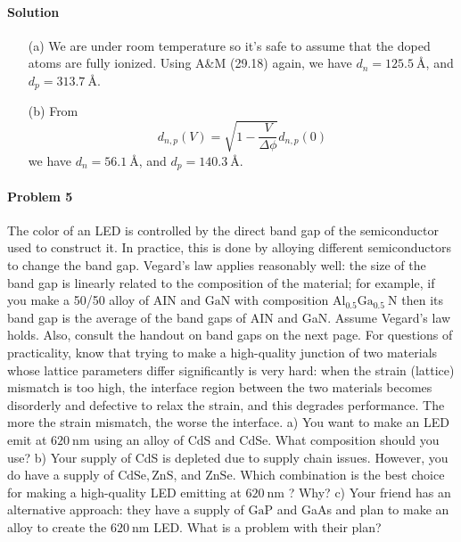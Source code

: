 \documentclass[hyperref, a4paper]{article}
\begin{document}
\paragraph{Solution} \begin{itemize}
\item[(a)] We are under room temperature so it's safe to assume 
that the doped atoms are fully ionized.
Using A\&M (29.18) again, we have $d_n = \SI{125.5}{\angstrom}$,
and $d_p = \SI{313.7}{\angstrom}$.
\item[(b)] From 
\begin{equation}
    d_{n, p}(V) = \sqrt{1 - \frac{V}{\Delta \phi}} d_{n, p}(0)
\end{equation}
we have 
$d_{n} = \SI{56.1}{\angstrom}$, and 
$d_{p} = \SI{140.3}{\angstrom}$.
\end{itemize}

\paragraph{Problem 5}  The color of an LED is controlled by the direct band gap of the semiconductor used to construct it. In practice, this is done by alloying different semiconductors to change the band gap. Vegard's law applies reasonably well: the size of the band gap is linearly related to the composition of the material; for example, if you make a 50/50 alloy of AIN and $\mathrm{GaN}$ with composition $\mathrm{Al}_{0.5} \mathrm{Ga}_{0.5} \mathrm{~N}$ then its band gap is the average of the band gaps of AIN and GaN. Assume Vegard's law holds. Also, consult the handout on band gaps on the next page. For questions of practicality, know that trying to make a high-quality junction of two materials whose lattice parameters differ significantly is very hard: when the strain (lattice) mismatch is too high, the interface region between the two materials becomes disorderly and defective to relax the strain, and this degrades performance. The more the strain mismatch, the worse the interface.
a) You want to make an LED emit at $620 \mathrm{~nm}$ using an alloy of CdS and CdSe. What composition should you use?
b) Your supply of CdS is depleted due to supply chain issues. However, you do have a supply of $\mathrm{CdSe}, \mathrm{ZnS}$, and $\mathrm{ZnSe}$. Which combination is the best choice for making a high-quality LED emitting at $620 \mathrm{~nm}$ ? Why?
c) Your friend has an alternative approach: they have a supply of $\mathrm{GaP}$ and GaAs and plan to make an alloy to create the $620 \mathrm{~nm}$ LED. What is a problem with their plan?
\end{document}
